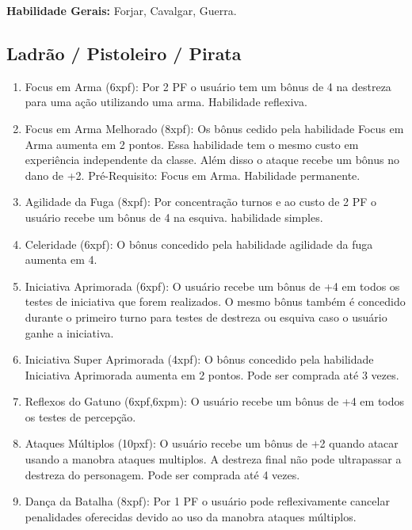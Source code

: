 \textbf{Habilidade Gerais:} Forjar, Cavalgar, Guerra.

\subsection{Ladrão / Pistoleiro / Pirata}

\begin{enumerate}

	\item Focus em Arma (6xpf): Por 2 PF o usuário tem um bônus de 4 na destreza para uma ação utilizando uma arma. Habilidade reflexiva.

	\item Focus em Arma Melhorado (8xpf): Os bônus cedido pela habilidade Focus em Arma aumenta em 2 pontos. Essa habilidade tem o mesmo custo em experiência independente da classe. Além disso o ataque recebe um bônus no dano de +2. Pré-Requisito: Focus em Arma. Habilidade permanente.

	\item Agilidade da Fuga (8xpf): Por concentração turnos e ao custo de 2 PF o usuário recebe um bônus de 4 na esquiva. habilidade simples.
	
	\item Celeridade (6xpf): O bônus concedido pela habilidade agilidade da fuga aumenta em 4.
	
	\item Iniciativa Aprimorada (6xpf): O usuário recebe um bônus de +4 em todos os testes de iniciativa que forem realizados. O mesmo bônus também é concedido durante o primeiro turno para testes de destreza ou esquiva caso o usuário ganhe a iniciativa.

	\item Iniciativa Super Aprimorada (4xpf): O bônus concedido pela habilidade Iniciativa Aprimorada aumenta em 2 pontos. Pode ser comprada até 3 vezes.

	\item Reflexos do Gatuno (6xpf,6xpm): O usuário recebe um bônus de +4 em todos os testes de percepção.

	\item Ataques Múltiplos (10pxf): O usuário recebe um bônus de +2 quando atacar usando a manobra ataques multiplos. A destreza final não pode ultrapassar a destreza do personagem. Pode ser comprada até 4 vezes. 

	\item Dança da Batalha (8xpf): Por 1 PF o usuário pode reflexivamente cancelar penalidades oferecidas devido ao uso da manobra ataques múltiplos.
	

\end{enumerate}
